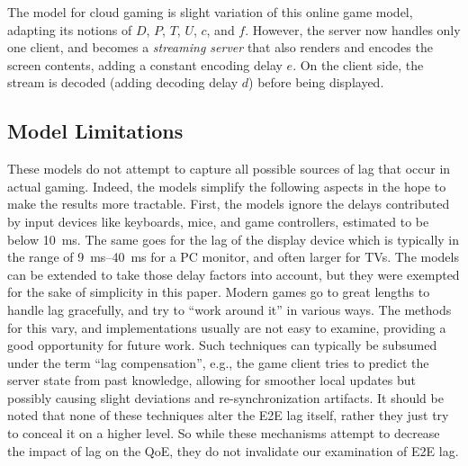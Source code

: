 The model for cloud gaming is slight variation of this online game model, adapting its notions of $D$, $P$, $T$, $U$, $c$, and $f$. However, the server now handles only one client, and becomes a \textit{streaming server} that also renders and encodes the screen contents, adding a constant encoding delay $e$. On the client side, the stream is decoded (adding decoding delay $d$) before being displayed.


\subsection{Model Limitations}

These models do not attempt to capture all possible sources of lag that occur in actual gaming. Indeed, the models simplify the following aspects in the hope to make the results more tractable. First, the models ignore the delays contributed by input devices like keyboards, mice, and game controllers, estimated to be below \SI{10}{\milli\second}. The same goes for the lag of the display device which is typically in the range of \SIrange{9}{40}{\milli\second} for a PC monitor, and often larger for TVs. The models can be extended to take those delay factors into account, but they were exempted for the sake of simplicity in this paper. Modern games go to great lengths to handle lag gracefully, and try to ``work around it'' in various ways. The methods for this vary, and implementations usually are not easy to examine, providing a good opportunity for future work. Such techniques can typically be subsumed under the term ``lag compensation'', e.g., the game client tries to predict the server state from past knowledge, allowing for smoother local updates but possibly causing slight deviations and re-synchronization artifacts. %
It should be noted that none of these techniques alter the \gls{E2E} lag itself, rather they just try to conceal it on a higher level. So while these mechanisms attempt to decrease the impact of lag on the \gls{QoE}, they do not invalidate our examination of \gls{E2E} lag.



